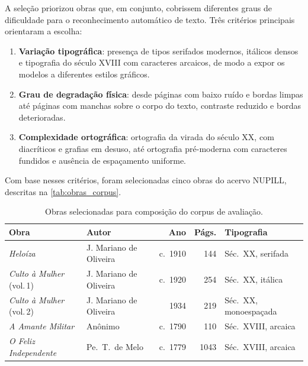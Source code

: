 \documentclass[noabntexcite,oneside]{ufsc-thesis-rn46-2019}
\begin{document}
A seleção priorizou obras que, em conjunto, cobrissem diferentes graus de dificuldade
para o reconhecimento automático de texto. Três critérios principais orientaram a escolha:

\begin{enumerate}
    \item \textbf{Variação tipográfica}: presença de tipos serifados modernos, itálicos
    densos e tipografia do século XVIII com caracteres arcaicos, de modo a expor os
    modelos a diferentes estilos gráficos.

    \item \textbf{Grau de degradação física}: desde páginas com baixo ruído e bordas
    limpas até páginas com manchas sobre o corpo do texto, contraste reduzido e bordas
    deterioradas.

    \item \textbf{Complexidade ortográfica}: ortografia da virada do século XX, com
    diacríticos e grafias em desuso, até ortografia pré-moderna com caracteres fundidos
    e ausência de espaçamento uniforme.
\end{enumerate}

Com base nesses critérios, foram selecionadas cinco obras do acervo NUPILL, descritas na
\autoref{tab:obras_corpus}.

\begin{table}[htb]
\centering
\caption{Obras selecionadas para composição do corpus de avaliação.}
\label{tab:obras_corpus}
\renewcommand{\arraystretch}{1.3}
\begin{tabular}{L{4.5cm} L{3.5cm} r r L{3.2cm}}
\hline \hline
\textbf{Obra} & \textbf{Autor} & \textbf{Ano} & \textbf{Págs.} & \textbf{Tipografia} \\
\hline \hline
\textit{Heloíza}
  & J. Mariano de Oliveira & c.\ 1910 & 144  & Séc.\ XX, serifada \\ \hline
\textit{Culto à Mulher} (vol.\,1)
  & J. Mariano de Oliveira & c.\ 1920 & 254  & Séc.\ XX, itálica \\ \hline
\textit{Culto à Mulher} (vol.\,2)
  & J. Mariano de Oliveira & 1934     & 219  & Séc.\ XX, monoespaçada \\ \hline
\textit{A Amante Militar}
  & Anônimo                & c.\ 1790 & 110  & Séc.\ XVIII, arcaica \\ \hline
\textit{O Feliz Independente}
  & Pe.\ T.\ de Melo       & c.\ 1779 & 1043 & Séc.\ XVIII, arcaica \\
\hline \hline
\end{tabular}
\end{table}
\end{document}
